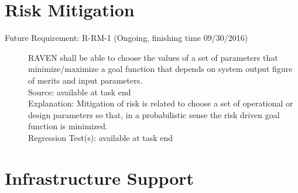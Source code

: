 \documentclass{article}
\newcommand{\futurerequirement}[6]{\item[Future Requirement: #1 #6] #2 \\Source: #3\\Explanation: #4\\Regression Test(s): #5}
\begin{document}
\section{Risk Mitigation}

\begin{description}

\futurerequirement{R-RM-1}{RAVEN shall be able to choose the values of a set of parameters that minimize/maximize a goal function that depends on system output figure of merits and input parameters.}
{available at task end}
{Mitigation of risk is related to choose a set of operational or design parameters so that, in a probabilistic sense the risk driven goal function is minimized.}
{available at task end}
{(Ongoing, finishing time 09/30/2016)}
\end{description}

\section{Infrastructure Support}
\end{document}
